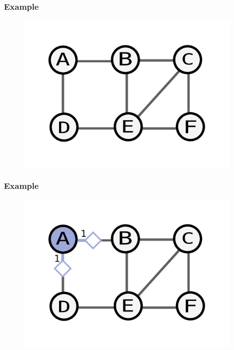 \documentclass{beamer}
\begin{document}
\begin{frame}
    \frametitle{Example}
    \begin{figure}
    \includegraphics[width=0.5\paperwidth]{base.pdf}
    \end{figure}
\end{frame}

\begin{frame}
    \frametitle{Example}
    \begin{figure}
    \includegraphics[width=0.5\paperwidth]{round1.pdf}
    \end{figure}
\end{frame}
\end{document}
